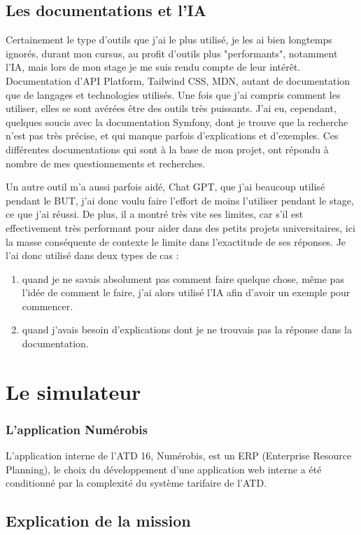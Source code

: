 \documentclass[a4paper,12pt]{report}
\begin{document}
\subsection{Les documentations et l'IA}
Certainement le type d'outils que j'ai le plus utilisé, je les ai bien longtemps ignorés, durant mon cursus, au profit d'outils plus "performants", notamment l'IA, mais lors de mon stage je me suis rendu compte de leur intérêt. Documentation d'API Platform, Tailwind CSS, MDN, autant de documentation que de langages et technologies utilisés. Une fois que j'ai compris comment les utiliser, elles se sont avérées être des outils très puissants. J'ai eu, cependant, quelques soucis avec la documentation Symfony, dont je trouve que la recherche n'est pas très précise, et qui manque parfois d'explications et d'exemples. Ces différentes documentations qui sont à la base de mon projet, ont répondu à nombre de mes questionnements et recherches.

Un autre outil m'a aussi parfois aidé, Chat GPT, que j'ai beaucoup utilisé pendant le BUT, j'ai donc voulu faire l'effort de moins l'utiliser pendant le stage, ce que j'ai réussi. De plus, il a montré très vite ses limites, car s'il est effectivement très performant pour aider dans des petits projets universitaires, ici la masse conséquente de contexte le limite dans l'exactitude de ses réponses. Je l'ai donc utilisé dans deux types de cas :
\begin{enumerate}
    \item quand je ne savais absolument pas comment faire quelque chose, même pas l'idée de comment le faire, j'ai alors utilisé l'IA afin d'avoir un exemple pour commencer.
    \item quand j'avais besoin d'explications dont je ne trouvais pas la réponse dans la documentation.
\end{enumerate}
 

\section{Le simulateur}
\subsubsection{L'application Numérobis}
L'application interne de l'ATD 16, Numérobis, est un ERP (Enterprise Resource Planning), le choix du développement d'une application web interne a été conditionné par la complexité du système tarifaire de l'ATD.

\subsection{Explication de la mission}
\end{document}

